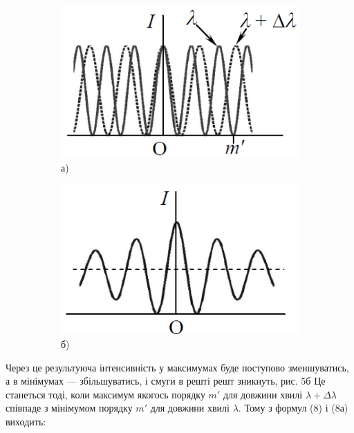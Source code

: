 \documentclass[12pt,a4paper]{article}
\begin{document}
    \begin{figure}[h!]

        \centering
        \begin{subfigure}[b]{0.45\textwidth}
            \centering
            \includegraphics[width=\textwidth]{5a.png}
            \caption*{а)}
        \end{subfigure}
        \hfill
        \begin{subfigure}[b]{0.45\textwidth}
            \centering
            \includegraphics[width=\textwidth]{5b.png}
            \caption*{б)}
        \end{subfigure}
        \caption{}
        \label{fig5:schema}

    \end{figure}

    Через це результуюча інтенсивність у максимумах буде поступово зменшуватись,
    а в мінімумах --- збільшуватись, і смуги в решті решт зникнуть, рис. 5б
    Це станеться тоді, коли максимум якогось порядку $m'$ для довжини
    хвилі $\lambda + \Delta \lambda$ співпаде з мінімумом порядку $m'$ для довжини
    хвилі $\lambda$. Тому з формул (8) і (8а) виходить:
\end{document}
